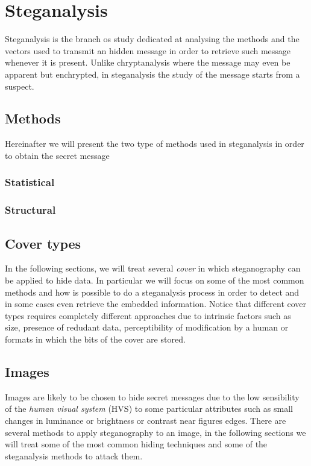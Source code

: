 \documentclass[../../main.tex]{subfiles}
\begin{document}
    
    \section{Steganalysis}
    Steganalysis is the branch os study dedicated at analysing the methods and
    the vectors used to transmit an hidden message in order to retrieve such
    message whenever it is present.
    Unlike chryptanalysis where the message may even be apparent but enchrypted,
    in steganalysis the study of the message starts from a suspect.
    \subsection{Methods}
    Hereinafter we will present the two type of methods used in steganalysis in
    order to obtain the secret message 

    \subsubsection{Statistical}

    \subsubsection{Structural}
    

    \subsection{Cover types}
    In the following sections, we will treat several \emph{cover} in which
    steganography can be applied to hide data.
    In particular we will focus on some of the most common methods and how is
    possible to do a steganalysis process in order to detect and in some cases
    even retrieve the embedded information.
    Notice that different cover types requires completely different approaches
    due to intrinsic factors such as size, presence of redudant data,
    perceptibility of modification by a human or formats in which the bits of
    the cover are stored.


    \subsection{Images}
    Images are likely to be chosen to hide secret messages due to the low
    sensibility of the \emph{human visual system} (HVS) to some particular
    attributes such as small changes in luminance or brightness or contrast near
    figures edges.
    There are several methods to apply steganography to an image, in the
    following sections we will treat some of the most common hiding techniques
    and some of the steganalysis methods to attack them.
\end{document}

